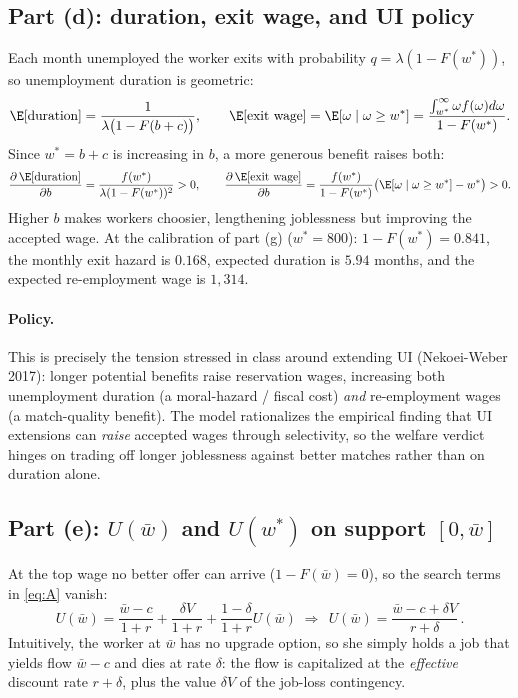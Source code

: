\documentclass[11pt]{article}
\begin{document}
\subsection*{Part (d): duration, exit wage, and UI policy}

Each month unemployed the worker exits with probability $q=\lambda(1-F(w^*))$,
so unemployment duration is geometric:
\begin{equation}
\E[\text{duration}]=\frac{1}{\lambda\bigl(1-F(b+c)\bigr)},\qquad
\E[\text{exit wage}]=\E[\omega\mid\omega\ge w^*]
 =\frac{\int_{w^*}^{\infty}\omega f(\omega)d\omega}{1-F(w^*)} .
\end{equation}
Since $w^*=b+c$ is increasing in $b$, a more generous benefit raises both:
\[
\frac{\partial\,\E[\text{duration}]}{\partial b}
 =\frac{f(w^*)}{\lambda(1-F(w^*))^{2}}>0,\qquad
\frac{\partial\,\E[\text{exit wage}]}{\partial b}
 =\frac{f(w^*)}{1-F(w^*)}\bigl(\E[\omega\mid\omega\ge w^*]-w^*\bigr)>0 .
\]
Higher $b$ makes workers choosier, lengthening joblessness but improving the
accepted wage. At the calibration of part (g) ($w^*=800$): $1-F(w^*)=0.841$,
the monthly exit hazard is $0.168$, expected duration is $5.94$ months, and the
expected re-employment wage is $1{,}314$.

\paragraph{Policy.} This is precisely the tension stressed in class around
extending UI (Nekoei-Weber 2017): longer potential benefits raise reservation
wages, increasing both unemployment duration (a moral-hazard / fiscal cost)
\emph{and} re-employment wages (a match-quality benefit). The model rationalizes
the empirical finding that UI extensions can \emph{raise} accepted wages through
selectivity, so the welfare verdict hinges on trading off longer joblessness
against better matches rather than on duration alone.

\subsection*{Part (e): $U(\bar w)$ and $U(w^{*})$ on support $[0,\bar w]$}

At the top wage no better offer can arrive ($1-F(\bar w)=0$), so the search
terms in \eqref{eq:A} vanish:
\[
U(\bar w)=\frac{\bar w-c}{1+r}+\frac{\delta V}{1+r}
   +\frac{1-\delta}{1+r}U(\bar w)
\;\Longrightarrow\;
\boxed{\,U(\bar w)=\frac{\bar w-c+\delta V}{r+\delta}\,.}
\]
Intuitively, the worker at $\bar w$ has no upgrade option, so she simply holds a
job that yields flow $\bar w-c$ and dies at rate $\delta$: the flow is
capitalized at the \emph{effective} discount rate $r+\delta$, plus the value
$\delta V$ of the job-loss contingency.
\end{document}
